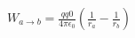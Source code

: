 \documentclass[preview]{standalone}
\begin{document}
\begin{align*}
W_{a \rightarrow b} = \frac{q q0}{4 \pi \epsilon_0} \left( \frac{1}{r_a} - \frac{1}{r_b} \right)
\end{align*}
\end{document}
